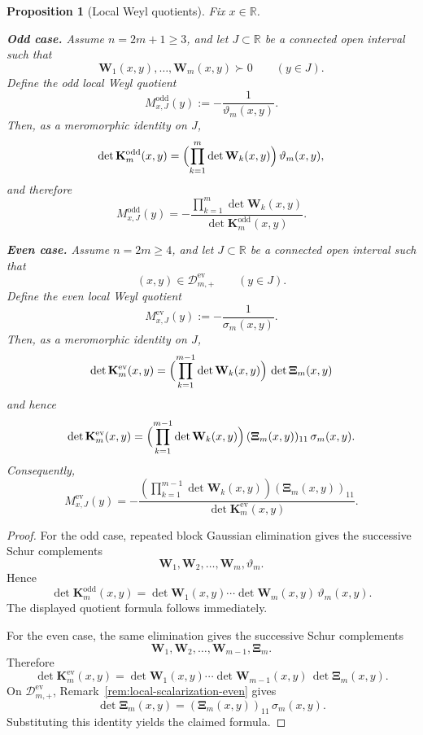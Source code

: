 \documentclass[11pt]{article}
\newtheorem{proposition}[theorem]{Proposition}
\begin{document}
\begin{proposition}[Local Weyl quotients]\label{prop:local-Weyl-quotients}
Fix \(x\in\mathbb{R}\).

\smallskip
\noindent
\textbf{Odd case.}
Assume \(n=2m+1\ge 3\), and let \(J\subset\mathbb{R}\) be a connected open interval such that
\[
\mathbf{W}_1(x,y),\dots,\mathbf{W}_m(x,y)\succ 0
\qquad (y\in J).
\]
Define the odd local Weyl quotient
\[
M^{\mathrm{odd}}_{x,J}(y):=-\frac{1}{\vartheta_m(x,y)}.
\]
Then, as a meromorphic identity on \(J\),
\[
\det \mathbf{K}^{\mathrm{odd}}_m(x,y)
=
\Bigl(\prod_{k=1}^m \det \mathbf{W}_k(x,y)\Bigr)\,\vartheta_m(x,y),
\]
and therefore
\[
M^{\mathrm{odd}}_{x,J}(y)
=
-\frac{\prod_{k=1}^{m}\det \mathbf{W}_k(x,y)}
{\det \mathbf{K}^{\mathrm{odd}}_m(x,y)}.
\]

\smallskip
\noindent
\textbf{Even case.}
Assume \(n=2m\ge 4\), and let \(J\subset\mathbb{R}\) be a connected open interval such that
\[
(x,y)\in \mathcal{D}_{m,+}^{\mathrm{ev}}
\qquad (y\in J).
\]
Define the even local Weyl quotient
\[
M^{\mathrm{ev}}_{x,J}(y):=-\frac{1}{\sigma_m(x,y)}.
\]
Then, as a meromorphic identity on \(J\),
\[
\det \mathbf{K}^{\mathrm{ev}}_m(x,y)
=
\Bigl(\prod_{k=1}^{m-1}\det \mathbf{W}_k(x,y)\Bigr)\,
\det \boldsymbol{\Xi}_m(x,y)
\]
and hence
\[
\det \mathbf{K}^{\mathrm{ev}}_m(x,y)
=
\Bigl(\prod_{k=1}^{m-1}\det \mathbf{W}_k(x,y)\Bigr)\,
(\boldsymbol{\Xi}_m(x,y))_{11}\,\sigma_m(x,y).
\]
Consequently,
\[
M^{\mathrm{ev}}_{x,J}(y)
=
-\frac{\left(\prod_{k=1}^{m-1}\det \mathbf{W}_k(x,y)\right)
(\boldsymbol{\Xi}_m(x,y))_{11}}
{\det \mathbf{K}^{\mathrm{ev}}_m(x,y)}.
\]
\end{proposition}

\begin{proof}
For the odd case, repeated block Gaussian elimination gives the successive Schur complements
\[
\mathbf{W}_1,\mathbf{W}_2,\dots,\mathbf{W}_m,\vartheta_m.
\]
Hence
\[
\det \mathbf{K}^{\mathrm{odd}}_m(x,y)
=
\det \mathbf{W}_1(x,y)\cdots \det \mathbf{W}_m(x,y)\,\vartheta_m(x,y).
\]
The displayed quotient formula follows immediately.

For the even case, the same elimination gives the successive Schur complements
\[
\mathbf{W}_1,\mathbf{W}_2,\dots,\mathbf{W}_{m-1},\boldsymbol{\Xi}_m.
\]
Therefore
\[
\det \mathbf{K}^{\mathrm{ev}}_m(x,y)
=
\det \mathbf{W}_1(x,y)\cdots \det \mathbf{W}_{m-1}(x,y)\,\det \boldsymbol{\Xi}_m(x,y).
\]
On \(\mathcal{D}_{m,+}^{\mathrm{ev}}\), Remark~\ref{rem:local-scalarization-even} gives
\[
\det \boldsymbol{\Xi}_m(x,y)
=
(\boldsymbol{\Xi}_m(x,y))_{11}\,\sigma_m(x,y).
\]
Substituting this identity yields the claimed formula.
\end{proof}
\end{document}
